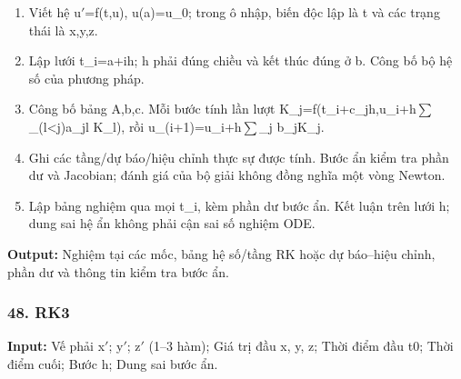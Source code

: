 \begin{enumerate}

\item Viết hệ u\ensuremath{\prime}=\allowbreak{}f(\allowbreak{}t,\allowbreak{}u),\allowbreak{} u(\allowbreak{}a)=\allowbreak{}u\_0;\allowbreak{} trong ô nhập,\allowbreak{} biến độc lập là t và các trạng thái là x,\allowbreak{}y,\allowbreak{}z.

\item Lập lưới t\_i=\allowbreak{}a+\allowbreak{}ih;\allowbreak{} h phải đúng chiều và kết thúc đúng ở b. Công bố bộ hệ số của phương pháp.

\item Công bố bảng A,\allowbreak{}b,\allowbreak{}c. Mỗi bước tính lần lượt K\_j=\allowbreak{}f(\allowbreak{}t\_i+\allowbreak{}c\_jh,\allowbreak{}u\_i+\allowbreak{}h\ensuremath{\sum}\_(\allowbreak{}l<j)a\_jl K\_l),\allowbreak{} rồi u\_(\allowbreak{}i+\allowbreak{}1)=\allowbreak{}u\_i+\allowbreak{}h\ensuremath{\sum}\_j b\_jK\_j.

\item Ghi các tầng/\allowbreak{}dự báo/\allowbreak{}hiệu chỉnh thực sự được tính. Bước ẩn kiểm tra phần dư và Jacobian;\allowbreak{} đánh giá của bộ giải không đồng nghĩa một vòng Newton.

\item Lập bảng nghiệm qua mọi t\_i,\allowbreak{} kèm phần dư bước ẩn. Kết luận trên lưới h;\allowbreak{} dung sai hệ ẩn không phải cận sai số nghiệm ODE.

\end{enumerate}

\textbf{Output:} Nghiệm tại các mốc,\allowbreak{} bảng hệ số/\allowbreak{}tầng RK hoặc dự báo–hiệu chỉnh,\allowbreak{} phần dư và thông tin kiểm tra bước ẩn.

\examplebreak\subsubsection*{48. RK3}

\textbf{Input:} Vế phải x\ensuremath{\prime};\allowbreak{} y\ensuremath{\prime};\allowbreak{} z\ensuremath{\prime} (\allowbreak{}1–3 hàm);\allowbreak{} Giá trị đầu x,\allowbreak{} y,\allowbreak{} z;\allowbreak{} Thời điểm đầu t0;\allowbreak{} Thời điểm cuối;\allowbreak{} Bước h;\allowbreak{} Dung sai bước ẩn.

